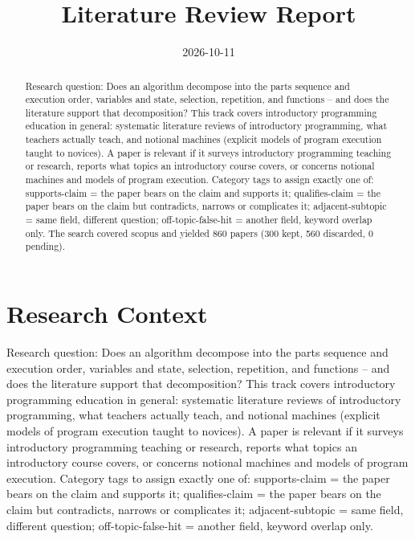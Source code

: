 \documentclass{article}
\title{Literature Review Report}
\date{2026-10-11}
\begin{document}
\maketitle

\begin{abstract}
Research question: Does an algorithm decompose into the parts sequence and execution order, variables and state, selection, repetition, and functions -- and does the literature support that decomposition? This track covers introductory programming education in general: systematic literature reviews of introductory programming, what teachers actually teach, and notional machines (explicit models of program execution taught to novices). A paper is relevant if it surveys introductory programming teaching or research, reports what topics an introductory course covers, or concerns notional machines and models of program execution. Category tags to assign exactly one of: supports-claim = the paper bears on the claim and supports it; qualifies-claim = the paper bears on the claim but contradicts, narrows or complicates it; adjacent-subtopic = same field, different question; off-topic-false-hit = another field, keyword overlap only. The search covered scopus and yielded 860 papers (300 kept, 560 discarded, 0 pending).
\end{abstract}
\clearpage
\clearpage
\tableofcontents
\clearpage

\section{Research Context}
Research question: Does an algorithm decompose into the parts sequence
and execution order, variables and state, selection, repetition, and
functions -- and does the literature support that decomposition? This
track covers introductory programming education in general: systematic
literature reviews of introductory programming, what teachers actually
teach, and notional machines (explicit models of program execution
taught to novices). A paper is relevant if it surveys introductory
programming teaching or research, reports what topics an introductory
course covers, or concerns notional machines and models of program
execution. Category tags to assign exactly one of: supports-claim = the
paper bears on the claim and supports it; qualifies-claim = the paper
bears on the claim but contradicts, narrows or complicates it;
adjacent-subtopic = same field, different question; off-topic-false-hit
= another field, keyword overlap only.
\end{document}
